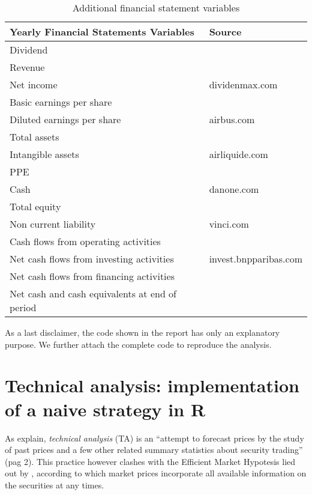 \documentclass[
  11pt,
]{article}
\begin{document}
\begin{table}[H]

\caption{\label{tab:second_half}Additional financial statement variables}
\centering
\begin{tabular}[t]{ll}
\toprule
Yearly Financial
Statements Variables & Source\\
\midrule
Dividend & \\
Revenue & \\
Net income & dividenmax.com\\
Basic earnings
per share & \\
Diluted earnings
per share & airbus.com\\
\addlinespace
Total assets & \\
Intangible assets & airliquide.com\\
PPE & \\
Cash & danone.com\\
Total equity & \\
\addlinespace
Non current liability & vinci.com\\
Cash flows from operating activities & \\
Net cash flows from
investing activities & invest.bnpparibas.com\\
Net cash flows from
financing activities & \\
Net cash and cash
equivalents at end of period & \\
\bottomrule
\end{tabular}
\end{table}

As a last disclaimer, the code shown in the report has only an
explanatory purpose. We further attach the complete code to reproduce
the analysis.

\newpage

\hypertarget{technical-analysis-implementation-of-a-naive-strategy-in-r}{%
\section{Technical analysis: implementation of a naive strategy in
R}\label{technical-analysis-implementation-of-a-naive-strategy-in-r}}

As \citet{Brock1992} explain, \emph{technical analysis} (TA) is an
``attempt to forecast prices by the study of past prices and a few other
related summary statistics about security trading'' (pag 2). This
practice however clashes with the Efficient Market Hypotesis lied out by
\citet{Fama1970} , according to which market prices incorporate all
available information on the securities at any times.
\end{document}
